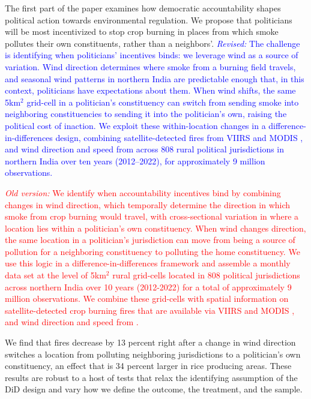 \documentclass[12pt]{article}
\begin{document}
The first part of the paper examines how democratic accountability shapes political action towards environmental regulation. We propose that politicians will be most incentivized to stop crop burning in places from which smoke pollutes their own constituents, rather than a neighbors'. \textcolor{blue}{\textit{Revised:} The challenge is identifying when politicians' incentives binds: we leverage wind as a source of variation. Wind direction determines where smoke from a burning field travels, and seasonal wind patterns in northern India are predictable enough that, in this context, politicians have expectations about them. When wind shifts, the same 5km$^2$ grid-cell in a politician's constituency can switch from sending smoke into neighboring constituencies to sending it into the politician's own, raising the political cost of inaction. We exploit these within-location changes in a difference-in-differences design, combining satellite-detected fires from VIIRS and MODIS \citep{VIIRS_Instrument_Overview}, and wind direction and speed from \cite{ERA5_monthly_pressure_levels_2023} across 808 rural political jurisdictions in northern India over ten years (2012–2022), for approximately 9 million observations.}

\textcolor{red}{\textit{Old version:} We identify when accountability incentives bind by combining changes in wind direction, which temporally determine the direction in which smoke from crop burning would travel, with cross-sectional variation in where a location lies within a politician's own constituency. When wind changes direction, the same location in a politician's jurisdiction can move from being a source of pollution for a neighboring constituency to polluting the home constituency.  We use this logic in a difference-in-differences framework and assemble a monthly data set at the level of 5km$^2$ rural grid-cells located in 808  political jurisdictions across northern India over 10 years (2012-2022) for a total of approximately 9 million observations. We combine these grid-cells with spatial information on satellite-detected crop burning fires that are available via VIIRS and MODIS \citep{VIIRS_Instrument_Overview}, and wind direction and speed from \cite{ERA5_monthly_pressure_levels_2023}.  
}

We find that fires decrease by 13 percent right after a change in wind direction switches a location from polluting neighboring jurisdictions to a politician's own constituency, an effect that is 34 percent larger in rice producing areas. These results are robust to a host of tests that relax the identifying assumption of the DiD design and vary how we define the outcome, the treatment, and the sample.%
\end{document}
